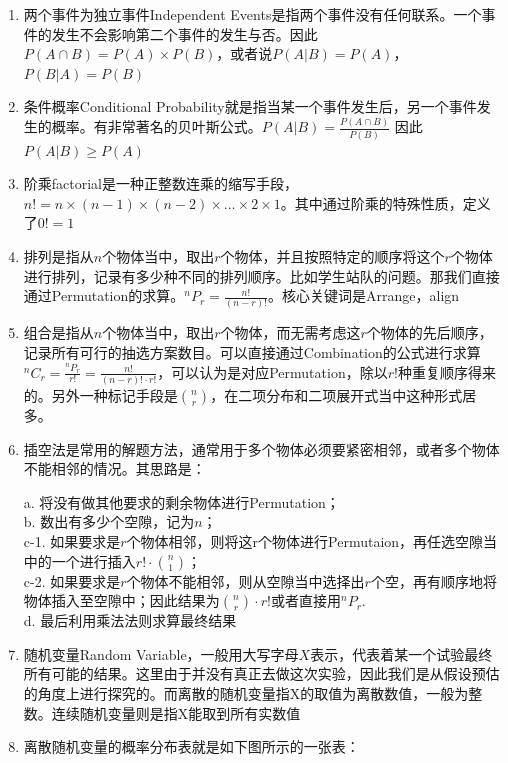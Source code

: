 \begin{enumerate}
\item 两个事件为\textcolor{r1}{独立事件Independent Events是指两个事件没有任何联系。一个事件的发生不会影响第二个事件的发生与否}。因此$P(A\cap B)=P(A)\times P(B)$，或者说$P(A|B)=P(A)$， $P(B|A)=P(B)$

\item 条件概率\textcolor{r1}{Conditional Probability}就是指当某一个事件发生后，另一个事件发生的概率。有非常著名的贝叶斯公式。$P(A|B)=\frac{P(A\cap B)}{P(B)}$ 因此$P(A|B)\ge P(A)$

\item 阶乘factorial是一种正整数连乘的缩写手段，$n!=n\times (n-1)\times (n-2)\times \ldots\times 2\times 1$。其中通过阶乘的特殊性质，定义了$0!=1$
\item 排列是指从$n$个物体当中，取出$r$个物体，并且按照特定的顺序将这个$r$个物体进行排列，记录有多少种不同的排列顺序。比如学生站队的问题。那我们直接通过Permutation的求算。$^nP_r=\frac{n!}{(n-r)!}$。核心关键词是\textcolor{r1}{Arrange，align}
\item 组合是指从$n$个物体当中，取出$r$个物体，而无需考虑这$r$个物体的先后顺序，记录所有可行的抽选方案数目。可以直接通过Combination的公式进行求算$^nC_r=\frac{^nP_r}{r!}=\frac{n!}{(n-r)!\cdot r!}$，可以认为是对应Permutation，除以$r!$种重复顺序得来的。另外一种标记手段是$n\choose r$，在二项分布和二项展开式当中这种形式居多。

\item 插空法是常用的解题方法，通常用于多个物体必须要\textcolor{r1}{紧密相邻}，或者多个物体\textcolor{r1}{不能相邻}的情况。其思路是：

a. 将没有做其他要求的剩余物体进行Permutation；\\
b. 数出有多少个空隙，记为$n$；\\
c-1. 如果要求是$r$个物体相邻，则将这r个物体进行Permutaion，再任选空隙当中的一个进行插入$r! \cdot{n \choose 1}$；\\
c-2. 如果要求是$r$个物体不能相邻，则从空隙当中选择出$r$个空，再\textcolor{r1}{有顺序地}将物体插入至空隙中；因此结果为${n\choose r} \cdot r!$或者直接用$^nP_r$.\\
d. 最后利用\textcolor{r1}{乘法法则}求算最终结果
\item 随机变量Random Variable，一般用大写字母$X$表示，代表着某一个试验最终所有可能的结果。这里由于并没有真正去做这次实验，因此我们是从假设预估的角度上进行探究的。而离散的随机变量指X的取值为离散数值，一般为\textcolor{r1}{整数}。连续随机变量则是指X能取到\textcolor{r1}{所有实数值}

\item 离散随机变量的概率分布表就是如下图所示的一张表：


\end{enumerate}
